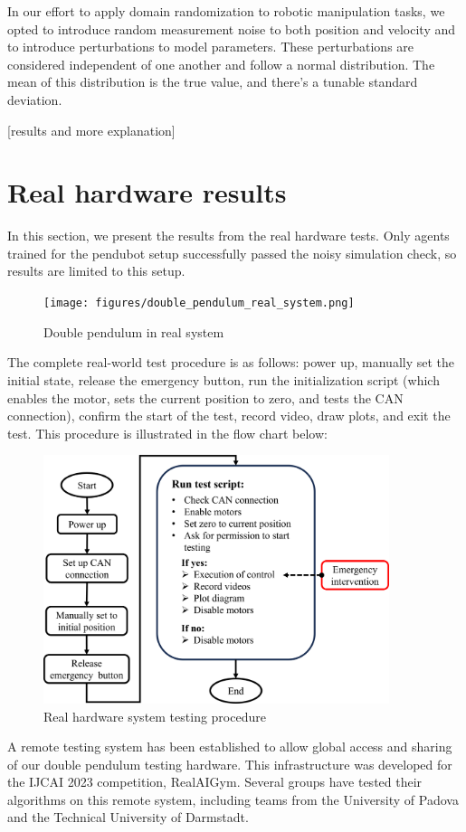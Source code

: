 In our effort to apply domain randomization to robotic manipulation tasks, we opted to introduce random measurement noise to both position and velocity and to introduce perturbations to model parameters. These perturbations are considered independent of one another and follow a normal distribution. The mean of this distribution is the true value, and there's a tunable standard deviation.

[results and more explanation]

\section{Real hardware results}
In this section, we present the results from the real hardware tests. Only agents trained for the pendubot setup successfully passed the noisy simulation check, so results are limited to this setup. 

\begin{figure}[H]
    \centering
    \texttt{[image: figures/double\_pendulum\_real\_system.png]}
    \caption{Double pendulum in real system}
    \label{fig:image_b}
\end{figure}

The complete real-world test procedure is as follows: power up, manually set the initial state, release the emergency button, run the initialization script (which enables the motor, sets the current position to zero, and tests the CAN connection), confirm the start of the test, record video, draw plots, and exit the test. This procedure is illustrated in the flow chart below:

\begin{figure}[H]
    \centering
    \includegraphics[width=0.9\textwidth]{figures/hardware_setup/testing_procedure.png}%
    \caption{Real hardware system testing procedure}
    \label{fig:image_b}
\end{figure}
A remote testing system has been established to allow global access and sharing of our double pendulum testing hardware. This infrastructure was developed for the IJCAI 2023 competition, RealAIGym. Several groups have tested their algorithms on this remote system, including teams from the University of Padova and the Technical University of Darmstadt.

